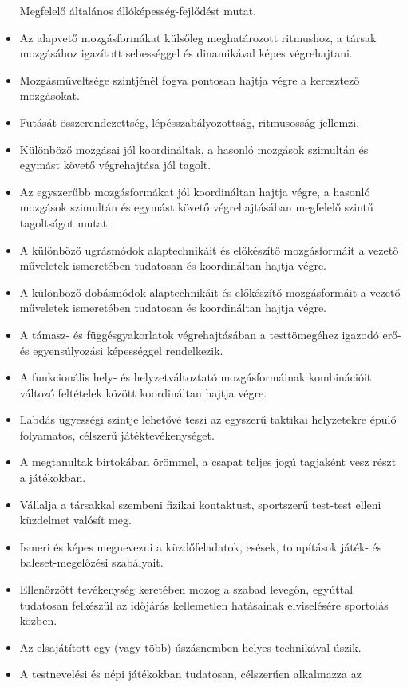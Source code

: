 \begin{itemize}
  Megfelelő általános állóképesség-fejlődést mutat.
\item
  Az alapvető mozgásformákat külsőleg meghatározott ritmushoz, a társak
  mozgásához igazított sebességgel és dinamikával képes végrehajtani.
\item
  Mozgásműveltsége szintjénél fogva pontosan hajtja végre a keresztező
  mozgásokat.
\item
  Futását összerendezettség, lépésszabályozottság, ritmusosság jellemzi.
\item
  Különböző mozgásai jól koordináltak, a hasonló mozgások szimultán és
  egymást követő végrehajtása jól tagolt.
\item
  Az egyszerűbb mozgásformákat jól koordináltan hajtja végre, a hasonló
  mozgások szimultán és egymást követő végrehajtásában megfelelő szintű
  tagoltságot mutat.
\item
  A különböző ugrásmódok alaptechnikáit és előkészítő mozgásformáit a
  vezető műveletek ismeretében tudatosan és koordináltan hajtja végre.
\item
  A különböző dobásmódok alaptechnikáit és előkészítő mozgásformáit a
  vezető műveletek ismeretében tudatosan és koordináltan hajtja végre.
\item
  A támasz- és függésgyakorlatok végrehajtásában a testtömegéhez igazodó
  erő- és egyensúlyozási képességgel rendelkezik.
\item
  A funkcionális hely- és helyzetváltoztató mozgásformáinak kombinációit
  változó feltételek között koordináltan hajtja végre.
\item
  Labdás ügyességi szintje lehetővé teszi az egyszerű taktikai
  helyzetekre épülő folyamatos, célszerű játéktevékenységet.
\item
  A megtanultak birtokában örömmel, a csapat teljes jogú tagjaként vesz
  részt a játékokban.
\item
  Vállalja a társakkal szembeni fizikai kontaktust, sportszerű test-test
  elleni küzdelmet valósít meg.
\item
  Ismeri és képes megnevezni a küzdőfeladatok, esések, tompítások játék-
  és baleset-megelőzési szabályait.
\item
  Ellenőrzött tevékenység keretében mozog a szabad levegőn, egyúttal
  tudatosan felkészül az időjárás kellemetlen hatásainak elviselésére
  sportolás közben.
\item
  Az elsajátított egy (vagy több) úszásnemben helyes technikával úszik.
\item
  A testnevelési és népi játékokban tudatosan, célszerűen alkalmazza az

\end{itemize}
